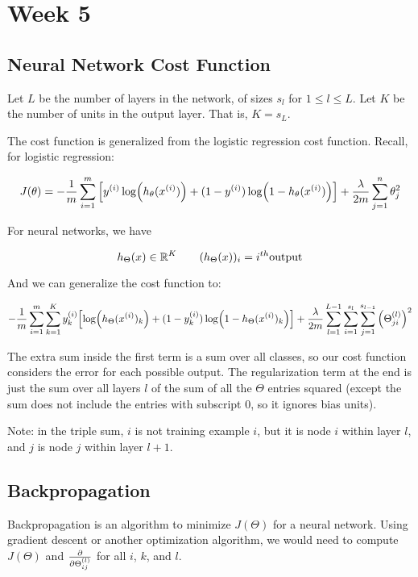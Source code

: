 \chapter{Week 5}

\section{Neural Network Cost Function}

Let $L$ be the number of layers in the network, of sizes $s_l$ for $1 \leq l \leq L$.
Let $K$ be the number of units in the output layer.
That is, $K = s_L$.

The cost function is generalized from the logistic regression cost function.
Recall, for logistic regression:

\[ 
    J(\theta) = -\frac{1}{m} 
    \sum_{i=1}^m \qty[
        y_{}^{(i)} \log(h_\theta(x_{}^{(i)})) + (1-y_{}^{(i)}) \log(1-h_\theta(x_{}^{(i)}))
    ]
    + \frac{\lambda}{2m} \sum_{j=1}^{n} \theta_j^2
\]

For neural networks, we have

\[
    h_\Theta(x) \in \mathbb{R}^K \qquad
    (h_\Theta(x))_i = i^{th} \mathrm{ output}
\]

And we can generalize the cost function to:

\[
    -\frac{1}{m} 
    \sum_{i=1}^m \sum_{k=1}^K y_k^{(i)} \qty[
        \log(h_\Theta(x^{(i)})_k) + (1-y_k^{(i)}) \log(1-h_\Theta(x^{(i)})_k)
    ]
    + \frac{\lambda}{2m} \sum_{l=1}^{L-1} \sum_{i=1}^{s_l} \sum_{j=1}^{s_{l-1}} \qty( \Theta_{ji}^{(l)} )^2
\]

The extra sum inside the first term is a sum over all classes,
so our cost function considers the error for each possible output.
The regularization term at the end is just the sum over all layers $l$
of the sum of all the $\Theta$ entries squared 
(except the sum does not include the entries with subscript 0, so it ignores bias units).

Note: in the triple sum, $i$ is not training example $i$, but it is node $i$ within layer $l$,
and $j$ is node $j$ within layer $l+1$.

\section{Backpropagation}

Backpropagation is an algorithm to minimize $J(\Theta)$ for a neural network.
Using gradient descent or another optimization algorithm, we would need to compute
$J(\Theta)$ and $\pdv{\Theta_{ij}^{(l)}}$ for all $i$, $k$, and $l$.

